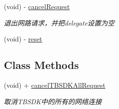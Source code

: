 \begin{DoxyCompactItemize}
\mbox{\label{interface_t_b_s_d_k_request_a38fc53970641eacc5c7e0a6095f64579}} 
(void) -\/ \mbox{\hyperlink{interface_t_b_s_d_k_request_a38fc53970641eacc5c7e0a6095f64579}{cancel\+Request}}
\begin{DoxyCompactList}\small\item\em 退出网路请求，并把delegate设置为空 \end{DoxyCompactList}\item 
(void) -\/ \mbox{\hyperlink{interface_t_b_s_d_k_request_aa8a1938d953fa9d55087184ef9154370}{reset}}
\end{DoxyCompactItemize}
\subsection*{Class Methods}
\begin{DoxyCompactItemize}
\item 
\mbox{\label{interface_t_b_s_d_k_request_a1806d3fbba4f00a0e981d77135298e2c}} 
(void) + \mbox{\hyperlink{interface_t_b_s_d_k_request_a1806d3fbba4f00a0e981d77135298e2c}{cancel\+T\+B\+S\+D\+K\+All\+Request}}
\begin{DoxyCompactList}\small\item\em 取消\+T\+B\+S\+D\+K中的所有的网络连接 \end{DoxyCompactList}\end{DoxyCompactItemize}
